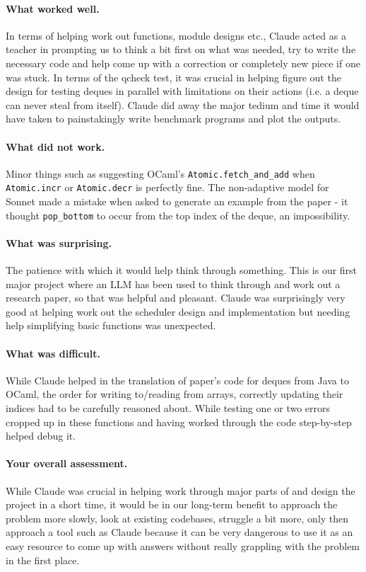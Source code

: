 \documentclass[11pt,a4paper]{article}
\begin{document}
\paragraph{What worked well.}
In terms of helping work out functions, module designs etc., Claude acted
as a teacher in prompting us to think a bit first on what was needed, try to
write the necessary code and help come up with a correction or completely new
piece if one was stuck. In terms of the qcheck test, it was crucial in helping
figure out the design for testing deques in parallel with limitations on their
actions (i.e. a deque can never steal from itself). Claude did away the major
tedium and time it would have taken to painstakingly write benchmark programs
and plot the outputs.


\paragraph{What did not work.}
Minor things such as suggesting OCaml's \texttt{Atomic.fetch\_and\_add} when
\texttt{Atomic.incr} or \texttt{Atomic.decr} is perfectly fine.
The non-adaptive model for Sonnet made a mistake when asked to generate an example
from the paper - it thought \texttt{pop\_bottom} to occur from the top index
of the deque, an impossibility.

\paragraph{What was surprising.}
The patience with which it would help think through something. This is our first
major project where an LLM has been used to think through and work out a
research paper, so that was helpful and pleasant. Claude was
surprisingly very good at helping work out the scheduler design and
implementation but needing help simplifying basic functions was unexpected.

\paragraph{What was difficult.}
While Claude helped in the translation of paper's code for deques from Java to
OCaml, the order for writing to/reading from arrays, correctly updating their
indices had to be carefully reasoned about. While testing one or two errors
cropped up in these functions and having worked through the code step-by-step
helped debug it.

\paragraph{Your overall assessment.}
While Claude was crucial in helping work through major parts of and design the
project in a short time, it would be in our long-term benefit to approach the
problem more slowly, look at existing codebases, struggle a bit more, only then
approach a tool such as Claude because it can be very dangerous to use it as an
easy resource to come up with answers without really grappling with the problem
in the first place.
\end{document}
